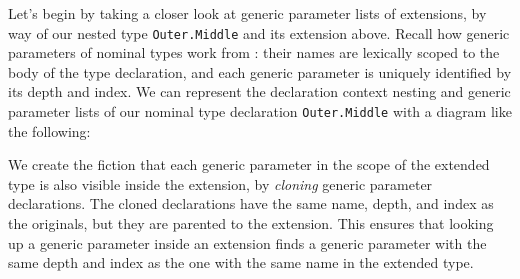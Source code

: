 \documentclass[../generics]{subfiles}
\begin{document}
Let's begin by taking a closer look at generic parameter lists of extensions, by way of our nested type \texttt{Outer.Middle} and its extension above. Recall how generic parameters of nominal types work from : their names are lexically scoped to the body of the type declaration, and each generic parameter is uniquely identified by its depth and index. We can represent the declaration context nesting and generic parameter lists of our nominal type declaration \texttt{Outer.Middle} with a diagram like the following:
\begin{quote}
\end{quote}

We create the fiction that each generic parameter in the scope of the extended type is also visible inside the extension, by \emph{cloning} generic parameter declarations. The cloned declarations have the same name, depth, and index as the originals, but they are parented to the extension. This ensures that looking up a generic parameter inside an extension finds a generic parameter with the same depth and index as the one with the same name in the extended type.
\end{document}
